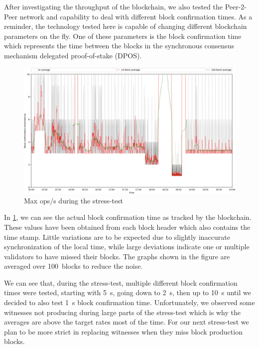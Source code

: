 After investigating the throughput of the blockchain, we also tested the
Peer-2-Peer network and capability to deal with different block confirmation
times. As a reminder, the technology tested here is capable of changing
different blockchain parameters on the fly. One of these parameters is the block
confirmation time which represents the time between the blocks in the
synchronous consensus mechanism delegated proof-of-stake (DPOS).

\begin{figure}[!htp]
 \centering
 \includegraphics[width=\linewidth]{figures/stress-test-block-time-full.png}
 \caption{Max ops/s during the stress-test}
 \label{fig:time-full}
\end{figure}

In \cref{fig:time-full}, we can see the actual block confirmation time as
tracked by the blockchain. These values have been obtained from each block
header which also contains the time stamp. Little variations are to be expected
due to slightly inaccurate synchronization of the local time, while large
deviations indicate one or multiple validators to have missed their blocks. The
graphs shown in the figure are averaged over \SI{100}{blocks} to reduce the
noise.

We can see that, during the stress-test, multiple different block confirmation
times were tested, starting with \SI{5}{s}, going down to \SI{2}{s}, then
up to \SI{10}{s} until we decided to also test \SI{1}{s} block confirmation
time. Unfortunately, we observed some witnesses not producing during large
parts of the stress-test which is why the averages are above the target rates
most of the time. For our next stress-test we plan to be more strict in
replacing witnesses when they miss block production blocks.

